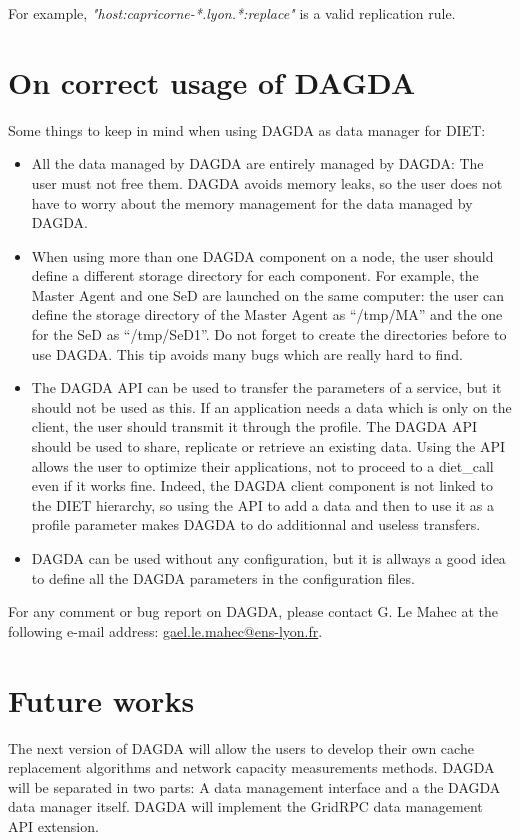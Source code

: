 For example, \textit{"host:capricorne-*.lyon.*:replace"} is a valid replication
rule.

\section{On correct usage of DAGDA}
Some things to keep in mind when using DAGDA as data manager for
DIET:
\begin{itemize}
\item All the data managed by DAGDA are entirely managed by DAGDA: The user
  must not free them. DAGDA avoids memory leaks, so the user does not
  have to worry about the memory management for the data managed by DAGDA.
\item When using more than one DAGDA component on a node, the user should
  define a different storage directory for each component. For example,
  the Master Agent and one SeD are launched on the same computer: the
  user can define the storage directory of the Master Agent as ``/tmp/MA''
  and the one for the SeD as ``/tmp/SeD1''. Do not forget to create the
  directories before to use DAGDA. This tip avoids many bugs which are
  really hard to find.
\item The DAGDA API can be used to transfer the parameters of a service,
  but it should not be used as this. If an application needs a data which
  is only on the client, the user should transmit it through the profile.
  The DAGDA API should be used to share, replicate or retrieve an existing
  data. Using the API allows the user to optimize their applications, not
  to proceed to a diet\_call even if it works fine. Indeed, the DAGDA
  client component is not linked to the DIET hierarchy, so using the API to
  add a data and then to use it as a profile parameter makes DAGDA to
  do additionnal and useless transfers.
\item DAGDA can be used without any configuration, but it is allways a
  good idea to define all the DAGDA parameters in the configuration files.
\end{itemize}

For any comment or bug report on DAGDA, please contact G. Le Mahec
at the following e-mail address: \url{gael.le.mahec@ens-lyon.fr}.

\section{Future works}
The next version of DAGDA will allow the users to develop their own cache
replacement algorithms and network capacity measurements methods.
DAGDA will be separated in two parts: A data management interface and a the
DAGDA data manager itself. DAGDA will implement the GridRPC data management API
extension.